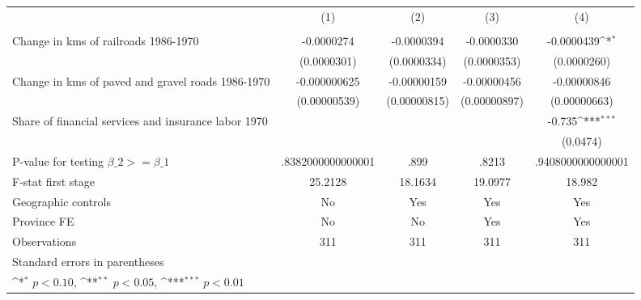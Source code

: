 {
\def\sym#1{\ifmmode^{#1}\else\(^{#1}\)\fi}
\begin{tabular}{l*{4}{c}}
\hline\hline
                &\multicolumn{1}{c}{(1)}&\multicolumn{1}{c}{(2)}&\multicolumn{1}{c}{(3)}&\multicolumn{1}{c}{(4)}\\
                &\multicolumn{1}{c}{}&\multicolumn{1}{c}{}&\multicolumn{1}{c}{}&\multicolumn{1}{c}{}\\
\hline
Change in kms of railroads 1986-1970&-0.0000274         &-0.0000394         &-0.0000330         &-0.0000439\sym{*}  \\
                &(0.0000301)         &(0.0000334)         &(0.0000353)         &(0.0000260)         \\
[1em]
Change in kms of paved and gravel roads 1986-1970&-0.000000625         &-0.00000159         &-0.00000456         &-0.00000846         \\
                &(0.00000539)         &(0.00000815)         &(0.00000897)         &(0.00000663)         \\
[1em]
Share of financial services and insurance labor 1970&                  &                  &                  &   -0.735\sym{***}\\
                &                  &                  &                  & (0.0474)         \\
\hline
P-value for testing $\beta\_{2} >= \beta\_{1}$&.8382000000000001         &     .899         &    .8213         &.9408000000000001         \\
F-stat first stage&  25.2128         &  18.1634         &  19.0977         &   18.982         \\
Geographic controls&       No         &      Yes         &      Yes         &      Yes         \\
Province FE     &       No         &       No         &      Yes         &      Yes         \\
Observations    &      311         &      311         &      311         &      311         \\
\hline\hline
\multicolumn{5}{l}{\footnotesize Standard errors in parentheses}\\
\multicolumn{5}{l}{\footnotesize \sym{*} \(p<0.10\), \sym{**} \(p<0.05\), \sym{***} \(p<0.01\)}\\
\end{tabular}
}
